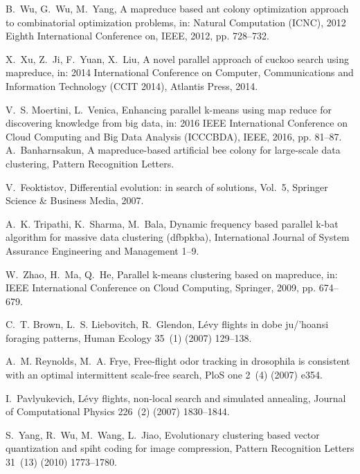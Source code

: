 \documentclass[review]{elsarticle}
\begin{document}
\begin{thebibliography}{10}
B.~Wu, G.~Wu, M.~Yang, A mapreduce based ant colony optimization approach to
  combinatorial optimization problems, in: Natural Computation (ICNC), 2012
  Eighth International Conference on, IEEE, 2012, pp. 728--732.

X.~Xu, Z.~Ji, F.~Yuan, X.~Liu, A novel parallel approach of cuckoo search using
  mapreduce, in: 2014 International Conference on Computer, Communications and
  Information Technology (CCIT 2014), Atlantis Press, 2014.

V.~S. Moertini, L.~Venica, Enhancing parallel k-means using map reduce for
  discovering knowledge from big data, in: 2016 IEEE International Conference
  on Cloud Computing and Big Data Analysis (ICCCBDA), IEEE, 2016, pp. 81--87.
A.~Banharnsakun, A mapreduce-based artificial bee colony for large-scale data
  clustering, Pattern Recognition Letters.

V.~Feoktistov, Differential evolution: in search of solutions, Vol.~5, Springer
  Science \& Business Media, 2007.

A.~K. Tripathi, K.~Sharma, M.~Bala, Dynamic frequency based parallel k-bat
  algorithm for massive data clustering (dfbpkba), International Journal of
  System Assurance Engineering and Management  1--9.

W.~Zhao, H.~Ma, Q.~He, Parallel k-means clustering based on mapreduce, in: IEEE
  International Conference on Cloud Computing, Springer, 2009, pp. 674--679.





C.~T. Brown, L.~S. Liebovitch, R.~Glendon, L{\'e}vy flights in dobe ju/’hoansi
  foraging patterns, Human Ecology 35~(1) (2007) 129--138.

A.~M. Reynolds, M.~A. Frye, Free-flight odor tracking in drosophila is
  consistent with an optimal intermittent scale-free search, PloS one 2~(4)
  (2007) e354.

I.~Pavlyukevich, L{\'e}vy flights, non-local search and simulated annealing,
  Journal of Computational Physics 226~(2) (2007) 1830--1844.

S.~Yang, R.~Wu, M.~Wang, L.~Jiao, Evolutionary clustering based vector
  quantization and spiht coding for image compression, Pattern Recognition
  Letters 31~(13) (2010) 1773--1780.


\end{thebibliography}
\end{document}
